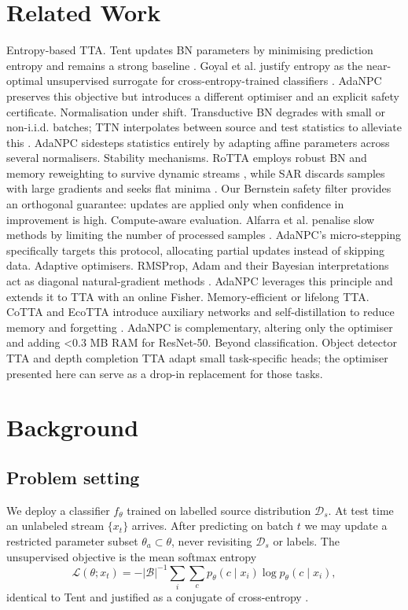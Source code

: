 \documentclass{article} %
\begin{document}
\section{Related Work}
\label{sec:related}
Entropy-based TTA. Tent updates BN parameters by minimising prediction entropy and remains a strong baseline \cite{wang-2020-tent}. Goyal et al. justify entropy as the near-optimal unsupervised surrogate for cross-entropy-trained classifiers \cite{goyal-2022-test}. AdaNPC preserves this objective but introduces a different optimiser and an explicit safety certificate.
Normalisation under shift. Transductive BN degrades with small or non-i.i.d. batches; TTN interpolates between source and test statistics to alleviate this \cite{lim-2023-ttn}. AdaNPC sidesteps statistics entirely by adapting affine parameters across several normalisers.
Stability mechanisms. RoTTA employs robust BN and memory reweighting to survive dynamic streams \cite{yuan-2023-robust}, while SAR discards samples with large gradients and seeks flat minima \cite{niu-2023-towards}. Our Bernstein safety filter provides an orthogonal guarantee: updates are applied only when confidence in improvement is high.
Compute-aware evaluation. Alfarra et al. penalise slow methods by limiting the number of processed samples \cite{alfarra-2023-evaluation}. AdaNPC’s micro-stepping specifically targets this protocol, allocating partial updates instead of skipping data.
Adaptive optimisers. RMSProp, Adam and their Bayesian interpretations act as diagonal natural-gradient methods \cite{aitchison-2018-bayesian}. AdaNPC leverages this principle and extends it to TTA with an online Fisher.
Memory-efficient or lifelong TTA. CoTTA and EcoTTA introduce auxiliary networks and self-distillation to reduce memory and forgetting \cite{song-2023-ecotta}. AdaNPC is complementary, altering only the optimiser and adding <0.3 MB RAM for ResNet-50.
Beyond classification. Object detector TTA \cite{yoo-2023-what} and depth completion TTA \cite{park-2024-test} adapt small task-specific heads; the optimiser presented here can serve as a drop-in replacement for those tasks.

\section{Background}
\label{sec:background}
\subsection{Problem setting}
We deploy a classifier \(f_{\theta}\) trained on labelled source distribution \(\mathcal{D}_s\). At test time an unlabeled stream \(\{x_t\}\) arrives. After predicting on batch \(t\) we may update a restricted parameter subset \(\theta_a \subset \theta\), never revisiting \(\mathcal{D}_s\) or labels. The unsupervised objective is the mean softmax entropy
\[
\mathcal{L}(\theta; x_t) = -|\mathcal{B}|^{-1} \sum_i \sum_c p_{\theta}(c\mid x_i) \log p_{\theta}(c\mid x_i),
\]
identical to Tent \cite{wang-2020-tent} and justified as a conjugate of cross-entropy \cite{goyal-2022-test}.
\end{document}
